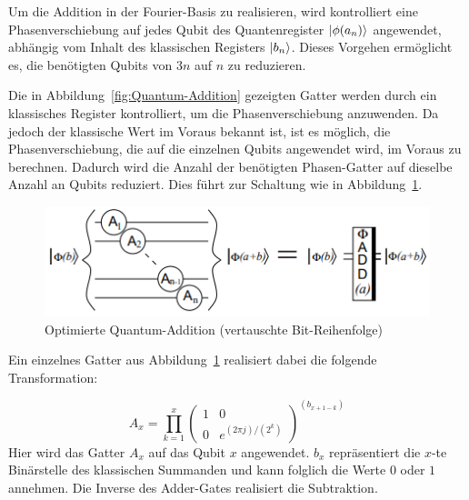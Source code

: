 \documentclass[a4paper,journal]{IEEEtran}
\begin{document}
Um die Addition in der Fourier-Basis zu realisieren,
wird kontrolliert eine Phasenverschiebung auf jedes Qubit des Quantenregister
\(\ket{\phi(a_n)}\) angewendet,
abhängig vom Inhalt des klassischen Registers \(\ket{b_n}\).
Dieses Vorgehen ermöglicht es,
die benötigten Qubits von \(3n\) auf \(n\) zu reduzieren.

Die in Abbildung~\ref{fig:Quantum-Addition} gezeigten Gatter werden durch ein klassisches Register kontrolliert,
um die Phasenverschiebung anzuwenden.
Da jedoch der klassische Wert im Voraus bekannt ist,
ist es möglich, die Phasenverschiebung, die auf die einzelnen Qubits angewendet wird,
im Voraus zu berechnen.
Dadurch wird die Anzahl der benötigten Phasen-Gatter auf dieselbe Anzahl an Qubits reduziert.
Dies führt zur Schaltung wie in Abbildung~\ref{fig:A_gate}.

\begin{figure}[!h]
\caption{Optimierte Quantum-Addition (vertauschte Bit-Reihenfolge)~\cite{beauregard2003circuit}}
\label{fig:A_gate}
\includegraphics[width=\linewidth]{A_gate.PNG}
\centering
\end{figure}
Ein einzelnes Gatter aus Abbildung~\ref{fig:A_gate} realisiert dabei die folgende Transformation:

\begin{equation}
A_{x} = \prod_{k=1}^x{
\begin{pmatrix}
  1 & 0 \\
  0 & e^{({2\pi j})/({2^{k}})}
\end{pmatrix}^{(b_{x+1-k})}}
\end{equation}
Hier wird das Gatter \(A_{x}\) auf das Qubit \(x\) angewendet.
\(b_{x}\) repräsentiert die \(x\)-te Binärstelle des klassischen Summanden und
kann folglich die Werte \(0\) oder \(1\) annehmen.
Die Inverse des Adder-Gates realisiert die Subtraktion. 
\end{document}
